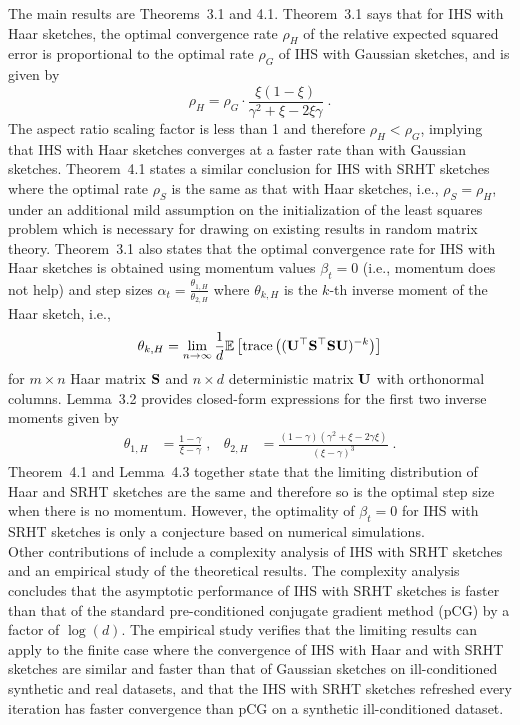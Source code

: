 The main results are Theorems~3.1 and 4.1. Theorem~3.1 says that for IHS with Haar sketches, the optimal convergence rate $\rho_H$ of the relative expected squared error is proportional to the optimal rate $\rho_G$ of IHS with Gaussian sketches, and is given by
\[
\rho_H = \rho_G\cdot\frac{\xi(1-\xi)}{\gamma^2+\xi-2\xi\gamma} \;.
\]
The aspect ratio scaling factor is less than 1 and therefore $\rho_H<\rho_G$, implying that IHS with Haar sketches converges at a faster rate than with Gaussian sketches.  Theorem~4.1 states a similar conclusion for IHS with SRHT sketches where the optimal rate $\rho_S$ is the same as that with Haar sketches, i.e., $\rho_S=\rho_H$, under an additional mild assumption on the initialization of the least squares problem which is necessary for drawing on existing results in random matrix theory. Theorem~3.1 also states that the optimal convergence rate for IHS with Haar sketches is obtained using momentum values $\beta_t=0$ (i.e., momentum does not help) and step sizes $\alpha_t = \frac{\theta_{1,H}}{\theta_{2,H}}$ where $\theta_{k,H}$ is the $k$-th inverse moment of the Haar sketch, i.e.,
\[
\theta_{k,H} = \lim_{n\rightarrow\infty}\frac{1}{d}\mathbb{E}\left[\mathrm{trace}\left((\mathbf{U}^\top\mathbf{S}^\top\mathbf{S}\mathbf{U})^{-k}\right)\right]
\]
for $m\times n$ Haar matrix $\mathbf{S}$ and $n\times d$ deterministic matrix $\mathbf{U}$ with orthonormal columns. Lemma~3.2 provides closed-form expressions for the first two inverse moments given by
\begin{align*}
\theta_{1,H} &= \frac{1-\gamma}{\xi-\gamma} \;, & \theta_{2,H} &= \frac{(1-\gamma)(\gamma^2+\xi-2\gamma\xi)}{(\xi-\gamma)^3} \;.
\end{align*}
Theorem~4.1 and Lemma~4.3 together state that the limiting distribution of Haar and SRHT sketches are the same and therefore so is the optimal step size when there is no momentum. However, the optimality of $\beta_t=0$ for IHS with SRHT sketches is only a conjecture based on numerical simulations.
\\

Other contributions of \citet{Lacotte:2020} include a complexity analysis of IHS with SRHT sketches and an empirical study of the theoretical results. The complexity analysis concludes that the asymptotic performance of IHS with SRHT sketches is faster than that of the standard pre-conditioned conjugate gradient method (pCG) \citep{Rokhlin:2008} by a factor of $\log(d)$. The empirical study verifies that the limiting results can apply to the finite case where the convergence of IHS with Haar and with SRHT sketches are similar and faster than that of Gaussian sketches on ill-conditioned synthetic and real datasets, and that the IHS with SRHT sketches refreshed every iteration has faster convergence than pCG on a synthetic ill-conditioned dataset.

